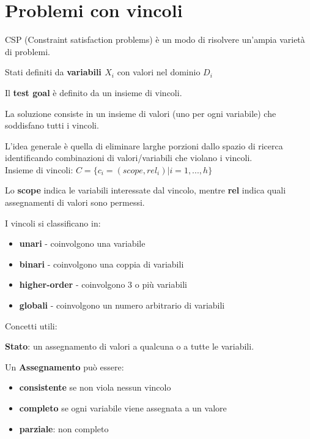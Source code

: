 \newpage

\section{Problemi con vincoli}

CSP (Constraint satisfaction problems) è un modo di risolvere un'ampia varietà
di problemi.

Stati definiti da \textbf{ variabili $X_i$ } con valori nel dominio $D_i$

Il \textbf{test goal} è definito da un insieme di vincoli.

La {soluzione} consiste in un insieme di valori (uno per ogni variabile) che
soddisfano tutti i vincoli.

L'idea generale è quella di eliminare larghe porzioni dallo spazio di ricerca
identificando combinazioni di valori/variabili che violano i vincoli.\\

Insieme di vincoli: $C = \{ c_i = (scope,rel_i) | i=1,...,h\}$

Lo \textbf{scope} indica le variabili interessate dal vincolo, mentre
\textbf{rel} indica quali assegnamenti di valori sono permessi.

I vincoli si classificano in:

\begin{itemize}
 \item \textbf{unari} - coinvolgono una variabile
 \item \textbf{binari} - coinvolgono una coppia di variabili
 \item \textbf{higher-order} - coinvolgono 3 o più variabili
 \item \textbf{globali} - coinvolgono un numero arbitrario di variabili
\end{itemize}

Concetti utili:

\textbf{Stato}: un assegnamento di valori a qualcuna o a tutte le variabili.

Un \textbf{Assegnamento} può essere:

\begin{itemize}
 \item \textbf{consistente} se non viola nessun vincolo
 \item \textbf{completo} se ogni variabile viene assegnata a un valore
 \item \textbf{parziale}: non completo
\end{itemize}

